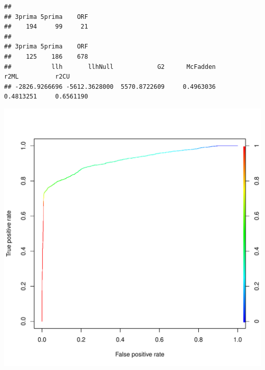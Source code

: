 \documentclass{article}\usepackage[]{graphicx}\usepackage[]{color}
\makeatletter
\def\maxwidth{ %
  \ifdim\Gin@nat@width>\linewidth
    \linewidth
  \else
    \Gin@nat@width
  \fi
}
\newenvironment{kframe}{%
 \def\at@end@of@kframe{}%
 \ifinner\ifhmode%
  \def\at@end@of@kframe{\end{minipage}}%
  \begin{minipage}{\columnwidth}%
 \fi\fi%
 \def\FrameCommand##1{\hskip\@totalleftmargin \hskip-\fboxsep
 \colorbox{shadecolor}{##1}\hskip-\fboxsep
     \hskip-\linewidth \hskip-\@totalleftmargin \hskip\columnwidth}%
 \MakeFramed {\advance\hsize-\width
   \@totalleftmargin\z@ \linewidth\hsize
   \@setminipage}}%
 {\par\unskip\endMakeFramed%
 \at@end@of@kframe}
\newenvironment{knitrout}{}{} %
\makeatother
\begin{document}
\begin{knitrout}
\begin{kframe}
{\ttfamily\noindent\itshape\color{messagecolor}{\#\# Loading required package: gplots}}

{\ttfamily\noindent\itshape\color{messagecolor}{\#\# \\\#\# Attaching package: 'gplots'}}

{\ttfamily\noindent\itshape\color{messagecolor}{\#\# The following object is masked from 'package:stats':\\\#\# \\\#\#\ \ \ \  lowess}}\begin{verbatim}
## 
## 3prima 5prima    ORF 
##    194     99     21
## 
## 3prima 5prima    ORF 
##    125    186    678
##           llh       llhNull            G2      McFadden          r2ML          r2CU 
## -2826.9266696 -5612.3628000  5570.8722609     0.4963036     0.4813251     0.6561190
\end{verbatim}
\end{kframe}

{\centering \includegraphics[width=\maxwidth]{figure/minimal-model-1} 

}



\end{knitrout}
\end{document}
